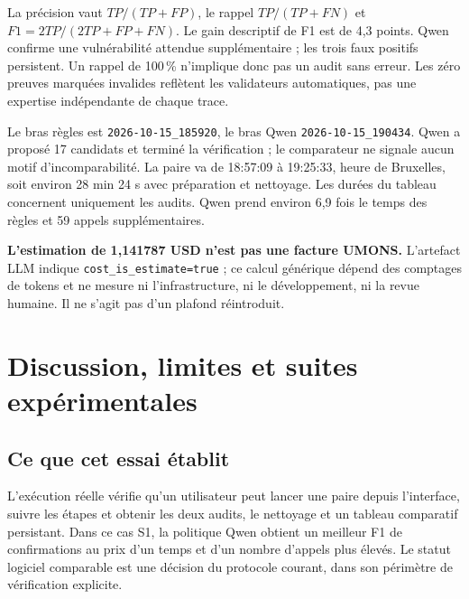 \documentclass[11pt,a4paper]{article}
\newcommand{\code}[1]{\nolinkurl{#1}}
\begin{document}
La précision vaut $TP/(TP+FP)$, le rappel $TP/(TP+FN)$ et
$F1=2TP/(2TP+FP+FN)$. Le gain descriptif de F1 est de 4,3 points. Qwen confirme
une vulnérabilité attendue supplémentaire ; les trois faux positifs persistent.
Un rappel de 100\,\% n'implique donc pas un audit sans erreur. Les zéro preuves
marquées invalides reflètent les validateurs automatiques, pas une expertise
indépendante de chaque trace.

Le bras règles est \code{2026-10-15_185920}, le bras Qwen
\code{2026-10-15_190434}. Qwen a proposé 17 candidats et terminé la
vérification ; le comparateur ne signale aucun motif d'incomparabilité. La paire
va de 18:57:09 à 19:25:33, heure de Bruxelles, soit environ 28 min 24 s avec
préparation et nettoyage. Les durées du tableau concernent uniquement les audits.
Qwen prend environ 6,9 fois le temps des règles et 59 appels supplémentaires.

\textbf{L'estimation de 1,141787 USD n'est pas une facture UMONS.} L'artefact
LLM indique \code{cost_is_estimate=true} ; ce calcul générique dépend des
comptages de tokens et ne mesure ni l'infrastructure, ni le développement, ni
la revue humaine. Il ne s'agit pas d'un plafond réintroduit.

\clearpage
\section{Discussion, limites et suites expérimentales}
\subsection{Ce que cet essai établit}
L'exécution réelle vérifie qu'un utilisateur peut lancer une paire depuis
l'interface, suivre les étapes et obtenir les deux audits, le nettoyage et un
tableau comparatif persistant. Dans ce cas S1, la politique Qwen obtient un
meilleur F1 de confirmations au prix d'un temps et d'un nombre d'appels plus
élevés. Le statut logiciel \og comparable\fg{} est une décision du protocole
courant, dans son périmètre de vérification explicite.
\end{document}
